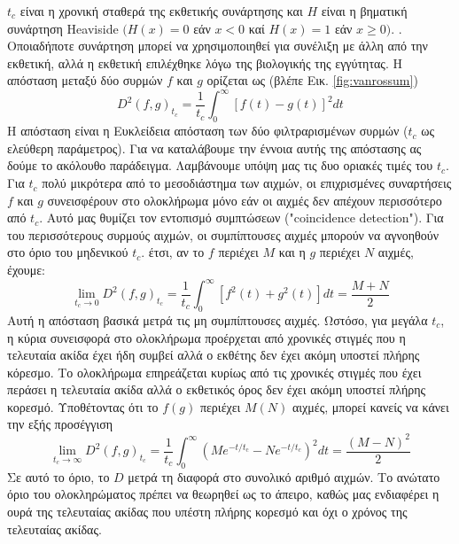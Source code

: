 \documentclass[12pt]{report}
\begin{document}
$t_{c}$ είναι η χρονική σταθερά της εκθετικής συνάρτησης και $H$ είναι η βηματική συνάρτηση \textlatin{Heaviside}  $(H(x)=0$ εάν $x<0$ καί $H(x)=1$ εάν $x \geq 0) .$ . Οποιαδήποτε συνάρτηση μπορεί να χρησιμοποιηθεί για συνέλιξη με άλλη από την εκθετική, αλλά η εκθετική επιλέχθηκε λόγω της βιολογικής της εγγύτητας. Η απόσταση μεταξύ δύο συρμών $f$ και $g$ ορίζεται ως (βλέπε Εικ. \ref{fig:vanrossum})
\begin{equation}
D^{2}(f, g)_{t_{c}}=\frac{1}{t_{c}} \int_{0}^{\infty}[f(t)-g(t)]^{2} d t
\end{equation}
Η απόσταση είναι η Ευκλείδεια απόσταση των δύο φιλτραρισμένων συρμών ($t_{c}$ ως ελεύθερη παράμετρος).
Για να καταλάβουμε την έννοια αυτής της απόστασης ας δούμε το ακόλουθο παράδειγμα. Λαμβάνουμε υπόψη μας τις δυο οριακές τιμές του $t_{c}.$ Για $t_{c}$ πολύ μικρότερα από το μεσοδιάστημα των αιχμών, οι επιχρισμένες συναρτήσεις $f$ και $g$ συνεισφέρουν στο ολοκλήρωμα μόνο εάν οι αιχμές δεν απέχουν περισσότερο από $t_{c}$. Αυτό μας θυμίζει τον εντοπισμό συμπτώσεων (\textlatin{"coincidence detection"}). Για του περισσότερους συρμούς αιχμών, οι συμπίπτουσες αιχμές μπορούν να αγνοηθούν στο όριο του μηδενικού $t_{c}$. έτσι, αν το $f$ περιέχει $M$ και η $g$ περιέχει $N$ αιχμές, έχουμε:
\begin{equation}
\lim _{t_{c} \rightarrow 0} D^{2}(f, g)_{t_{c}}=\frac{1}{t_{c}} \int_{0}^{\infty}\left[f^{2}(t)+g^{2}(t)\right] d t=\frac{M+N}{2}
\end{equation}
Αυτή η απόσταση βασικά μετρά τις μη συμπίπτουσες αιχμές.
Ωστόσο, για μεγάλα $t_{c}$, η κύρια συνεισφορά στο ολοκλήρωμα προέρχεται από χρονικές στιγμές που η τελευταία ακίδα έχει ήδη συμβεί αλλά ο εκθέτης δεν έχει ακόμη υποστεί πλήρης κόρεσμο. Το ολοκλήρωμα επηρεάζεται κυρίως από τις χρονικές στιγμές που έχει περάσει η τελευταία ακίδα αλλά ο εκθετικός όρος δεν έχει ακόμη υποστεί πλήρης κορεσμό. Υποθέτοντας ότι το $f(g)$ περιέχει $M(N)$ αιχμές, μπορεί κανείς να κάνει την εξής προσέγγιση
\begin{equation}
\lim _{t_{c} \rightarrow \infty} D^{2}(f, g)_{t_{c}}=\frac{1}{t_{c}} \int_{0}^{\infty}\left(M e^{-t / t_{\mathrm{c}}}-N e^{-t / t_{c}}\right)^{2} d t=\frac{(M-N)^{2}}{2}
\end{equation}
Σε αυτό το όριο, το $D$ μετρά τη διαφορά στο συνολικό αριθμό αιχμών. Το ανώτατο όριο του ολοκληρώματος πρέπει να θεωρηθεί ως το άπειρο, καθώς μας ενδιαφέρει η ουρά της τελευταίας ακίδας που υπέστη πλήρης κορεσμό και όχι ο χρόνος της τελευταίας ακίδας.
\end{document}
